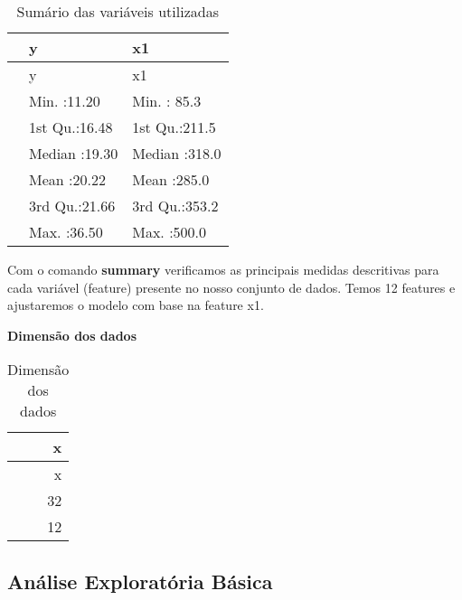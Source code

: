 \documentclass[
]{article}
\newenvironment{Shaded}{\begin{snugshade}}{\end{snugshade}}
\newcommand{\DataTypeTok}[1]{\textcolor[rgb]{0.13,0.29,0.53}{#1}}
\newcommand{\KeywordTok}[1]{\textcolor[rgb]{0.13,0.29,0.53}{\textbf{#1}}}
\newcommand{\NormalTok}[1]{#1}
\newcommand{\OperatorTok}[1]{\textcolor[rgb]{0.81,0.36,0.00}{\textbf{#1}}}
\newcommand{\StringTok}[1]{\textcolor[rgb]{0.31,0.60,0.02}{#1}}
\begin{document}
\begin{Shaded}
\end{Shaded}

\begin{longtable}[]{@{}lll@{}}
\caption{Sumário das variáveis utilizadas}\tabularnewline
\toprule
& y & x1\tabularnewline
\midrule
\endfirsthead
\toprule
& y & x1\tabularnewline
\midrule
\endhead
& Min. :11.20 & Min. : 85.3\tabularnewline
& 1st Qu.:16.48 & 1st Qu.:211.5\tabularnewline
& Median :19.30 & Median :318.0\tabularnewline
& Mean :20.22 & Mean :285.0\tabularnewline
& 3rd Qu.:21.66 & 3rd Qu.:353.2\tabularnewline
& Max. :36.50 & Max. :500.0\tabularnewline
\bottomrule
\end{longtable}

Com o comando \textbf{summary} verificamos as principais medidas
descritivas para cada variável (feature) presente no nosso conjunto de
dados. Temos 12 features e ajustaremos o modelo com base na feature x1.

\textbf{Dimensão dos dados}

\begin{Shaded}
\end{Shaded}

\begin{longtable}[]{@{}r@{}}
\caption{Dimensão dos dados}\tabularnewline
\toprule
x\tabularnewline
\midrule
\endfirsthead
\toprule
x\tabularnewline
\midrule
\endhead
32\tabularnewline
12\tabularnewline
\bottomrule
\end{longtable}

\hypertarget{anuxe1lise-exploratuxf3ria-buxe1sica}{%
\subsection{Análise Exploratória
Básica}\label{anuxe1lise-exploratuxf3ria-buxe1sica}}
\end{document}
